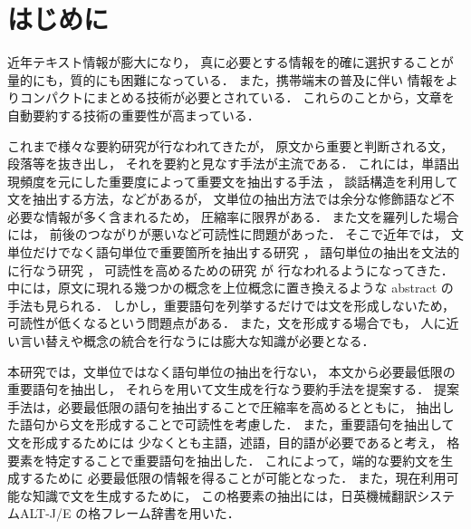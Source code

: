 

\maketitle
\newenvironment{indention}[1]{}{}

\section{はじめに}
\label{sec:intro}

近年テキスト情報が膨大になり，
真に必要とする情報を的確に選択することが
量的にも，質的にも困難になっている．
また，携帯端末の普及に伴い
情報をよりコンパクトにまとめる技術が必要とされている．
これらのことから，文章を自動要約する技術の重要性が高まっている．

これまで様々な要約研究が行なわれてきたが\cite{Okumura99}，
原文から重要と判断される文，段落等を抜き出し，
それを要約と見なす手法が主流である．
これには，単語出現頻度を元にした重要度によって重要文を抽出する手法
\cite{Edmundson69,Luhn58,Zechner96}，
談話構造を利用して文を抽出する方法\cite{Marcu97}，などがあるが，
文単位の抽出方法では余分な修飾語など不必要な情報が多く含まれるため，
圧縮率に限界がある．
また文を羅列した場合には，
前後のつながりが悪いなど可読性に問題があった．
そこで近年では，
文単位だけでなく語句単位で重要箇所を抽出する研究
\cite{Hovy97,Oka2000}，
 語句単位の抽出を文法的に行なう研究
\cite{Knight2000,Jin2000}，
可読性を高めるための研究
\cite{Mani99,Nanba2000}が
行なわれるようになってきた．
中には，原文に現れる幾つかの概念を上位概念に置き換えるような
abstract の手法も見られる\cite{Hovy97}．
しかし，重要語句を列挙するだけでは文を形成しないため，
可読性が低くなるという問題点がある．
また，文を形成する場合でも，
人に近い言い替えや概念の統合を行なうには膨大な知識が必要となる．

本研究では，文単位ではなく語句単位の抽出を行ない，
本文から必要最低限の重要語句を抽出し，
それらを用いて文生成を行なう要約手法を提案する．
提案手法は，必要最低限の語句を抽出することで圧縮率を高めるとともに，
抽出した語句から文を形成することで可読性を考慮した．
また，重要語句を抽出して文を形成するためには
少なくとも主語，述語，目的語が必要であると考え，
格要素を特定することで重要語句を抽出した．
これによって，端的な要約文を生成するために
必要最低限の情報を得ることが可能となった．
また，現在利用可能な知識で文を生成するために，
この格要素の抽出には，日英機械翻訳システムALT-J/E\cite{Ikehara91} 
の格フレーム辞書\cite{Goi-Taikei99}を用いた．


